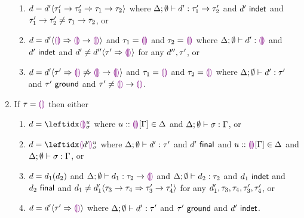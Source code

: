 \begin{lem}
\begin{enumerate}[nolistsep]
\begin{enumerate}
          \item $\dexp = \dcasttwo{\dexp'}{\tarr{\htau_1'}{\htau_2'}}{\tarr{\htau_1}{\htau_2}}$ where $\hasType{\hDelta}{\emptyset}{\dexp'}{\tarr{\htau_1'}{\htau_2'}}$ and $\isIndet{\dexp'}$ and $\tarr{\htau_1'}{\htau_2'} \neq \tarr{\htau_1}{\htau_2}$, or 
          \item $\dexp = \dcasttwo{\dexp'}{\tehole}{\tarr{\tehole}{\tehole}}$ and $\htau_1 = \tehole$ and $\htau_2 = \tehole$ where $\hasType{\hDelta}{\emptyset}{\dexp'}{\tehole}$ and $\isIndet{\dexp'}$ and $\dexp' \neq \dcasttwo{\dexp''}{\htau'}{\tehole}$ for any $\dexp'', \htau'$, or 
          \item $\dexp = \dcastfail{\dexp'}{\htau'}{\tarr{\tehole}{\tehole}}$ and $\htau_1 = \tehole$ and $\htau_2 = \tehole$ where $\hasType{\hDelta}{\emptyset}{\dexp'}{\htau'}$ and $\isGround{\htau'}$ and $\htau' \neq \tarr{\tehole}{\tehole}$.
        \end{enumerate}
    \item 
      If $\htau = \tehole$ then either 
        \begin{enumerate}
          \item $\dexp = \dehole{u}{\subst}{}$ where $\Dbinding{u}{\Gamma}{\tehole} \in \hDelta$ and $\hasType{\hDelta}{\emptyset}{\subst}{\hGamma}$, or
          \item $\dexp = \dhole{\dexp'}{u}{\subst}{}$ where $\hasType{\hDelta}{\emptyset}{\dexp'}{\htau'}$ and $\isFinal{\dexp'}$ and $\Dbinding{u}{\Gamma}{\tehole} \in \hDelta$ and $\hasType{\hDelta}{\emptyset}{\subst}{\hGamma}$, or
          \item $\dexp = \dap{\dexp_1}{\dexp_2}$ and $\hasType{\hDelta}{\emptyset}{\dexp_1}{\tarr{\htau_2}{\tehole}}$ and $\hasType{\hDelta}{\emptyset}{\dexp_2}{\htau_2}$ and $\isIndet{\dexp_1}$ and $\isFinal{\dexp_2}$ and $\dexp_1 \neq \dcasttwo{\dexp_1'}{\tarr{\htau_3}{\htau_4}}{\tarr{\htau_3'}{\htau_4'}}$ for any $\dexp_1', \htau_3, \htau_4, \htau_3', \htau_4'$, or 
          \item $\dexp = \dcasttwo{\dexp'}{\htau'}{\tehole}$ where $\hasType{\hDelta}{\emptyset}{\dexp'}{\htau'}$ and $\isGround{\htau'}$ and $\isIndet{\dexp'}$.
        \end{enumerate}
  \end{enumerate}

\end{lem}
